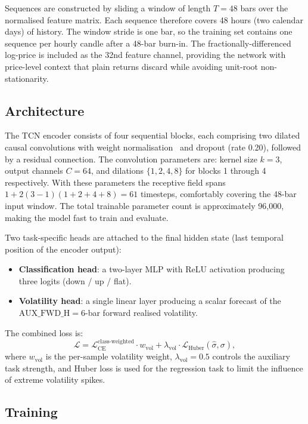 Sequences are constructed by sliding a window of length $T = 48$ bars over the normalised feature matrix. Each sequence therefore covers 48 hours (two calendar days) of history. The window stride is one bar, so the training set contains one sequence per hourly candle after a 48-bar burn-in. The fractionally-differenced log-price is included as the 32nd feature channel, providing the network with price-level context that plain returns discard while avoiding unit-root non-stationarity.

\subsection{Architecture}

The TCN encoder consists of four sequential blocks, each comprising two dilated causal convolutions with weight normalisation~\cite{salimans2016weight} and dropout (rate 0.20), followed by a residual connection. The convolution parameters are: kernel size $k = 3$, output channels $C = 64$, and dilations $\{1, 2, 4, 8\}$ for blocks 1 through 4 respectively. With these parameters the receptive field spans $1 + 2(3-1)(1+2+4+8) = 61$ timesteps, comfortably covering the 48-bar input window. The total trainable parameter count is approximately 96,000, making the model fast to train and evaluate.


Two task-specific heads are attached to the final hidden state (last temporal position of the encoder output):
\begin{itemize}
    \item \textbf{Classification head}: a two-layer MLP with ReLU activation producing three logits (down / up / flat).
    \item \textbf{Volatility head}: a single linear layer producing a scalar forecast of the $\text{AUX\_FWD\_H} = 6$-bar forward realised volatility.
\end{itemize}

The combined loss is:
\begin{equation}
    \mathcal{L} = \mathcal{L}_{\text{CE}}^{\text{class-weighted}} \cdot w_{\text{vol}} + \lambda_{\text{vol}} \cdot \mathcal{L}_{\text{Huber}}(\hat{\sigma}, \sigma),
\end{equation}
where $w_{\text{vol}}$ is the per-sample volatility weight, $\lambda_{\text{vol}} = 0.5$ controls the auxiliary task strength, and Huber loss is used for the regression task to limit the influence of extreme volatility spikes.

\subsection{Training}

